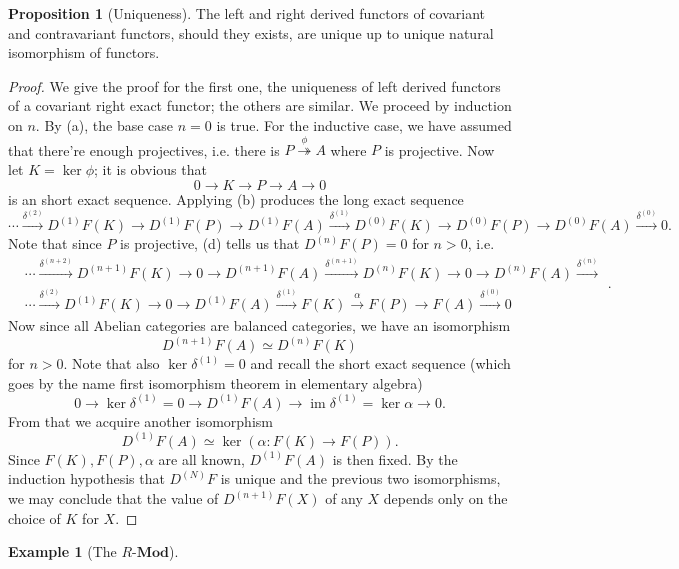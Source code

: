 \documentclass[10pt]{report}
\theoremstyle{definition}
\newtheorem{proposition}{Proposition}
\newtheorem{example}{Example}
\begin{document}
\begin{proposition}[Uniqueness]
The left and right derived functors of covariant and contravariant functors, should they exists, are unique up to unique natural isomorphism of functors.
\end{proposition}
\begin{proof}
We give the proof for the first one, the uniqueness of left derived functors of a covariant right exact functor; the others are similar. We proceed by induction on $n$. By (a), the base case $n=0$ is true. For the inductive case, we have assumed that there're enough projectives, i.e. there is $P\overset{\phi}{\twoheadrightarrow}A$ where $P$ is projective. Now let $K=\ker\phi$; it is obvious that $$0\to K\to P\to A\to 0$$ is an short exact sequence. Applying (b) produces the long exact sequence $$\cdots\overset{\delta^{(2)}}{\to}D^{(1)}F(K)\to D^{(1)}F(P)\to D^{(1)}F(A)\overset{\delta^{(1)}}{\to}D^{(0)}F(K)\to D^{(0)}F(P)\to D^{(0)}F(A)\overset{\delta^{(0)}}{\to}0.$$ Note that since $P$ is projective, (d) tells us that $D^{(n)}F(P)=0$ for $n>0$, i.e. $$\begin{aligned}{}&\cdots\overset{\delta^{(n+2)}}{\to}D^{(n+1)}F(K)\to0\to D^{(n+1)}F(A)\overset{\delta^{(n+1)}}{\to}D^{(n)}F(K)\to0\to D^{(n)}F(A)\overset{\delta^{(n)}}{\to}\\{}&\cdots\overset{\delta^{(2)}}{\to}D^{(1)}F(K)\to0\to D^{(1)}F(A)\overset{\delta^{(1)}}{\to}F(K)\overset{\alpha}{\to}F(P)\to F(A)\overset{\delta^{(0)}}{\to}0\end{aligned}.$$ Now since all Abelian categories are balanced categories, we have an isomorphism $$D^{(n+1)}F(A)\simeq D^{(n)}F(K)$$ for $n>0$. Note that also $\ker\delta^{(1)}=0$ and recall the short exact sequence (which goes by the name first isomorphism theorem in elementary algebra) $$0\to\ker\delta^{(1)}=0\to D^{(1)}F(A)\to\operatorname{im}\delta^{(1)}=\ker\alpha\to0.$$ From that we acquire another isomorphism $$D^{(1)}F(A)\simeq\ker(\alpha:F(K)\to F(P)).$$ Since $F(K), F(P), \alpha$ are all known, $D^{(1)}F(A)$ is then fixed. By the induction hypothesis that $D^{(N)}F$ is unique and the previous two isomorphisms, we may conclude that the value of $D^{(n+1)}F(X)$ of any $X$ depends only on the choice of $K$ for $X$.
\end{proof}

\begin{example}[The $R\text{-}\mathbf{Mod}$]

\end{example}
\end{document}

